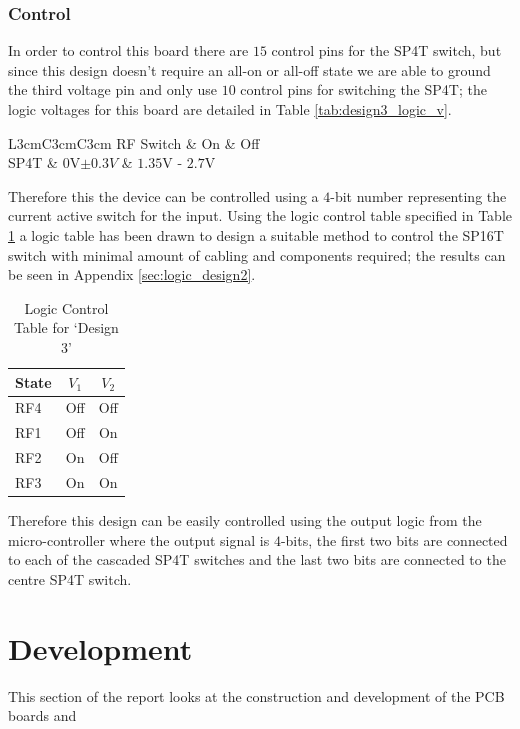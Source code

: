 \documentclass[12pt,openany,a4paper]{book}
\begin{document}
\subsubsection{Control}
In order to control this  board there are $15$ control pins for the SP4T switch, but since this design doesn't require an all-on or all-off state we are able to ground the third voltage pin and only use $10$ control pins for switching the SP4T; the logic voltages for this board are detailed in Table \ref{tab:design3_logic_v}.
\begin{table}[H]
	\centering
	\begin{tabular}{L{3cm}C{3cm}C{3cm}}
	\hline
	RF Switch & On & Off\\
	\hline
	SP4T & $0$V$\pm 0.3V$ & $1.35$V - $2.7$V \\
	\hline	
	\end{tabular}
	\caption{Logic Voltage Control}
	\label{tab:design3_logic_v}
\end{table}
Therefore this the device can be controlled using a $4$-bit number representing the current active switch for the input. Using the logic control table specified in Table \ref{tab:logic-cont-design3} a logic table has been drawn to design a suitable method to control the SP16T switch with minimal amount of cabling and components required; the results can be seen in Appendix \ref{sec:logic_design2}. 
\begin{table}[H]
	\centering
	\begin{tabular}{l c c }
		\hline
		State & $V_1$ & $V_2$\\
		\hline
		RF4 & Off & Off \\
		RF1 & Off & On \\
		RF2 & On & Off\\
		RF3 & On & On	\\	
		\hline
	\end{tabular}
    \caption{Logic Control Table for `Design 3'} \label{tab:logic-cont-design3}
\end{table}
Therefore this design can be easily controlled using the output logic from the micro-controller where the output signal is $4$-bits, the first two bits are connected to each of the cascaded SP4T switches and the last two bits are connected to the centre SP4T switch.


\section{Development}
This section of the report looks at the construction and development of the PCB boards and 
\end{document}
